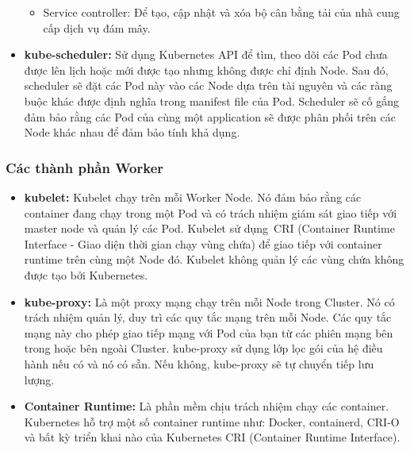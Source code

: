 \documentclass[12pt,a4paper]{report}
\begin{document}
\begin{itemize}
\begin{itemize}
	\item Service controller: Để tạo, cập nhật và xóa bộ cân bằng tải của nhà cung cấp dịch vụ đám mây.
	\end{itemize}
	
	\item \textbf{kube-scheduler:}
	\subitem
	Sử dụng Kubernetes API để tìm, theo dõi các Pod chưa được lên lịch hoặc mới được tạo nhưng không được chỉ định Node. Sau đó, scheduler sẽ đặt các Pod này vào các Node dựa trên tài nguyên và các ràng buộc khác được định nghĩa trong manifest file của Pod. Scheduler sẽ cố gắng đảm bảo rằng các Pod của cùng một application sẽ được phân phối trên các Node khác nhau để đảm bảo tính khả dụng.
	
	\hspace{0.8cm}{Các yếu tố được tính đến để đưa ra quyết định lập lịch bao gồm: yêu cầu tài nguyên cá nhân và tập thể, các ràng buộc về phần cứng / phần mềm / chính sách, thông số kỹ thuật về mối quan hệ và chống mối quan hệ, vị trí dữ liệu, can thiệp giữa khối lượng công việc và thời hạn.}
	\end{itemize}

	\subsubsection{Các thành phần Worker}
	\smallskip
	\hspace{1cm}{Có nhiệm vụ xử lý khối lượng công việc của application trong cluster, duy trì các nhóm đang chạy và cung cấp môi trường runtime cho Kubernetes. Worker sẽ bao gồm 3 thành phần chính sau:}
	\begin{itemize}
		\item \textbf{kubelet:}
		\subitem
		Kubelet chạy trên mỗi Worker Node. Nó đảm bảo rằng các container đang chạy trong một Pod và có trách nhiệm giám sát giao tiếp với master node và quản lý các Pod. Kubelet sử dụng CRI (Container Runtime Interface - Giao diện thời gian chạy vùng chứa) để giao tiếp với container runtime trên cùng một Node đó. Kubelet không quản lý các vùng chứa không được tạo bởi Kubernetes.
		
		\item \textbf{kube-proxy:}
		\subitem
		Là một proxy mạng chạy trên mỗi Node trong Cluster. Nó có trách nhiệm quản lý, duy trì các quy tắc mạng trên mỗi Node. Các quy tắc mạng này cho phép giao tiếp mạng với Pod của bạn từ các phiên mạng bên trong hoặc bên ngoài Cluster. kube-proxy sử dụng lớp lọc gói của hệ điều hành nếu có và nó có sẵn. Nếu không, kube-proxy sẽ tự chuyển tiếp lưu lượng.
		
		\item \textbf{Container Runtime:}
		\subitem
		Là phần mềm chịu trách nhiệm chạy các container. Kubernetes hỗ trợ một số container runtime như: Docker, containerd, CRI-O và bất kỳ triển khai nào của Kubernetes CRI (Container Runtime Interface).
	\end{itemize}
\end{document}
